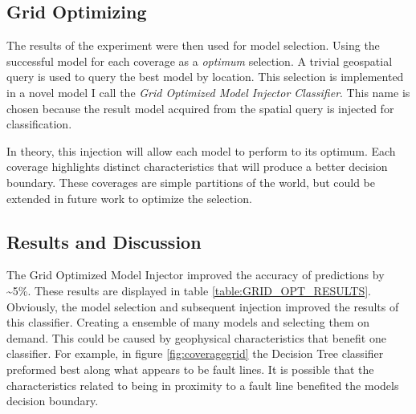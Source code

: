 \subsection{Grid Optimizing}
The results of the experiment were then used for model selection.
Using the successful model for each coverage as a \textit{optimum} selection.
A trivial geospatial query is used to query the best model by location.
This selection is implemented in a novel model I call the \textit{Grid Optimized Model Injector Classifier}.
This name is chosen because the result model acquired from the spatial query is injected for classification.

\par
In theory, this injection will allow each model to perform to its optimum.
Each coverage highlights distinct characteristics that will produce a better decision boundary.
These coverages are simple partitions of the world, but could be extended in future work to optimize the selection.


\subsection{Results and Discussion}


\par
The Grid Optimized Model Injector improved the accuracy of predictions by \~{}5\%.
These results are displayed in table \ref{table:GRID_OPT_RESULTS}.
Obviously, the model selection and subsequent injection improved the results of this classifier.
Creating a ensemble of many models and selecting them on demand.
This could be caused by geophysical characteristics that benefit one classifier.
For example, in figure \ref{fig:coveragegrid} the Decision Tree classifier preformed best along what appears to be fault lines.
It is possible that the characteristics related to being in proximity to a fault line benefited the models decision boundary. 

